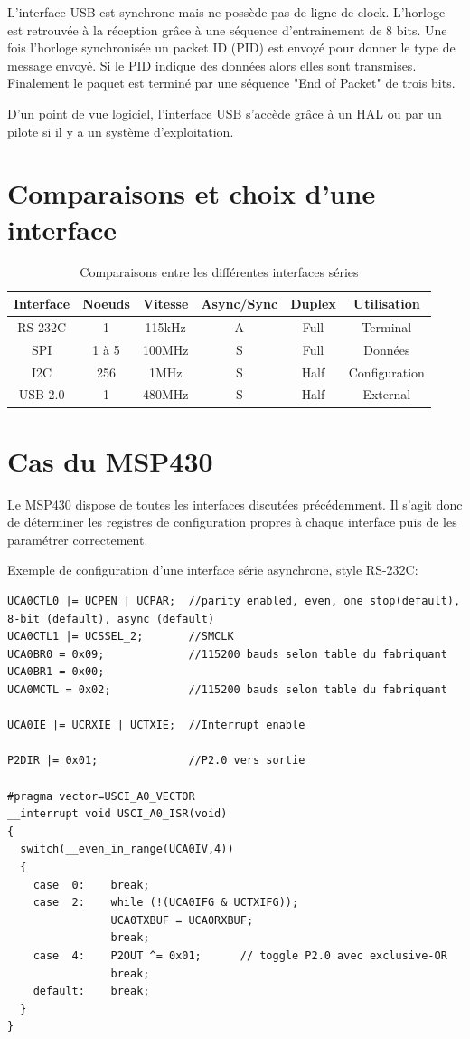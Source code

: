 L'interface USB est synchrone mais ne possède pas de ligne de clock. L'horloge est retrouvée à la réception grâce à une séquence d'entrainement de 8 bits. Une fois l'horloge synchronisée un packet ID (PID) est envoyé pour donner le type de message envoyé. Si le PID indique des données alors elles sont transmises. Finalement le paquet est terminé par une séquence "End of Packet" de trois bits.

D'un point de vue logiciel, l'interface USB s'accède grâce à un HAL ou par un pilote si il y a un système d'exploitation.

\section{Comparaisons et choix d'une interface}

\begin{table}[!htbp]
\begin{center}
{\selectfont
\begin{tabular}{|c|c|c|c|c|c|}
\hline 
Interface & Noeuds & Vitesse & Async/Sync & Duplex & Utilisation\\
\hline  
\hline 
RS-232C & 1 & 115kHz & A & Full & Terminal\\
\hline 
SPI & 1 à 5 & 100MHz & S & Full & Données\\
\hline
I2C & 256 & 1MHz & S & Half & Configuration\\
\hline
USB 2.0 & 1 & 480MHz & S & Half & External\\
\hline
\end{tabular}
}
\end{center}
\caption{Comparaisons entre les différentes interfaces séries \label{serial}}
\end{table}

\section{Cas du MSP430}

Le MSP430 dispose de toutes les interfaces discutées précédemment. Il s'agit donc de déterminer les registres de configuration propres à chaque interface puis de les paramétrer correctement.

Exemple de configuration d'une interface série asynchrone, style RS-232C:

\lstset{style=customc}
\begin{lstlisting}
UCA0CTL0 |= UCPEN | UCPAR;	//parity enabled, even, one stop(default), 8-bit (default), async (default)
UCA0CTL1 |= UCSSEL_2;		//SMCLK
UCA0BR0 = 0x09;				//115200 bauds selon table du fabriquant
UCA0BR1 = 0x00;
UCA0MCTL = 0x02;			//115200 bauds selon table du fabriquant		
 
UCA0IE |= UCRXIE | UCTXIE;	//Interrupt enable
	
P2DIR |= 0x01;				//P2.0 vers sortie 	 
 
#pragma vector=USCI_A0_VECTOR
__interrupt void USCI_A0_ISR(void)
{
  switch(__even_in_range(UCA0IV,4))
  {
    case  0: 	break;
    case  2: 	while (!(UCA0IFG & UCTXIFG));
				UCA0TXBUF = UCA0RXBUF;
				break;
    case  4: 	P2OUT ^= 0x01;		// toggle P2.0 avec exclusive-OR 
				break;
    default: 	break;
  }
}
\end{lstlisting}

